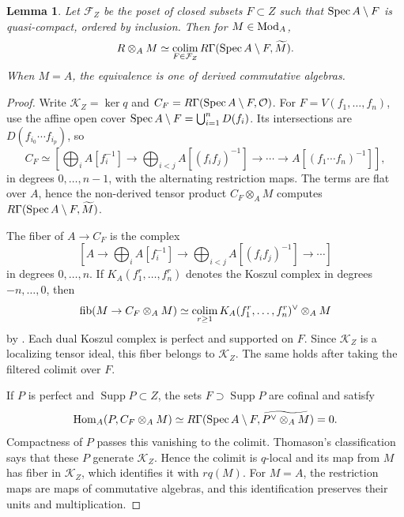 \documentclass[12pt, letter]{amsart}
\newtheorem{lemma}[theorem]{Lemma}
\theoremstyle{definition}
\newcommand{\OO}{\mathcal O}
\DeclareMathOperator{\Supp}{Supp}
\numberwithin{equation}{section}
\begin{document}
\begin{lemma}\label{lem:smashing-open-colimit}
Let $\mathcal F_Z$ be the poset of closed subsets $F\subset Z$
such that $\operatorname{Spec} A\setminus F$ is quasi-compact, ordered by inclusion. Then for $M \in \operatorname{Mod}_A$,
\[
 R\otimes_A M\simeq\operatorname*{colim}_{F\in\mathcal F_Z}
       R\Gamma(\operatorname{Spec} A\setminus F,\widetilde M).
\]
When $M = A$, the equivalence is one of derived commutative algebras. 
\end{lemma}
\begin{proof}
Write $\mathcal K_Z=\ker q$ and
$C_F=R\Gamma(\Spec A\setminus F,\OO)$.  
For $F=V(f_1,\ldots,f_n)$, use the affine open cover
$\operatorname{Spec} A\setminus F=\bigcup_{i=1}^n D(f_i)$.
Its intersections are $D(f_{i_0}\cdots f_{i_p})$, so
\[
 C_F\simeq\left[
 \bigoplus_i A[f_i^{-1}]\longrightarrow
 \bigoplus_{i<j}A[(f_if_j)^{-1}]\longrightarrow\cdots
 \longrightarrow A[(f_1\cdots f_n)^{-1}]
 \right],
\]
in degrees $0,\ldots,n-1$, with the alternating restriction maps.
The terms are flat over $A$, hence the non-derived tensor product
$C_F\otimes_A M$ computes  $R\Gamma(\operatorname{Spec} A\setminus F,\widetilde M)$.

The fiber of $A\to C_F$ is the complex
\[
 \left[A\longrightarrow\bigoplus_i A[f_i^{-1}]
 \longrightarrow\bigoplus_{i<j}A[(f_if_j)^{-1}]
 \longrightarrow\cdots\right]
\]
in degrees $0,\ldots,n$.
If $K_A(f_1^r,\ldots,f_n^r)$ denotes the Koszul complex in degrees
$-n,\ldots,0$, then
\[
 \operatorname{fib}(M\to C_F\otimes_A M)
 \simeq\operatorname*{colim}_{r\ge1}
       K_A(f_1^r,\ldots,f_n^r)^\vee\otimes_A M
\]
by \cite[Section~36.9]{Stacks-section23}.
Each dual Koszul complex is perfect and supported on $F$.
Since $\mathcal K_Z$ is a localizing tensor ideal, this fiber belongs to $\mathcal K_Z$.
The same holds after taking the filtered colimit over $F$.

If $P$ is perfect and $\Supp P\subset Z$, the sets
$F\supset\Supp P$ are cofinal and satisfy
\[
 \operatorname{Hom}_A(P,C_F\otimes_A M)
 \simeq R\Gamma(\operatorname{Spec} A\setminus F,
                    \widetilde{P^\vee\otimes_A M})=0.
\]
Compactness of $P$ passes this vanishing to the colimit.
Thomason's classification \cite[Theorem~3.15]{Thomason} says that
these $P$ generate $\mathcal K_Z$.
Hence the colimit is $q$-local and its map from $M$ has fiber in
$\mathcal K_Z$, which identifies it with $rq(M)$.
For $M=A$, the restriction maps are maps of commutative algebras,
and this identification preserves their units and multiplication.
\end{proof}
\end{document}
